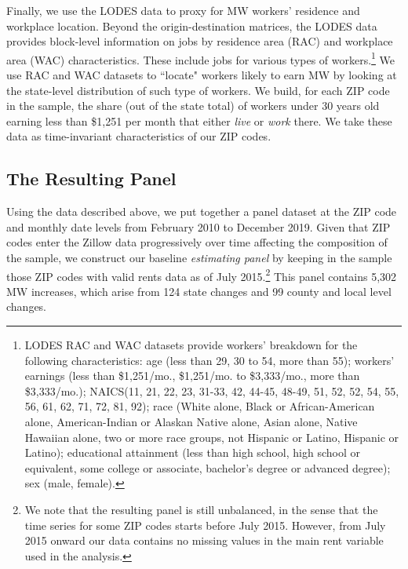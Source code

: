 Finally, we use the LODES data to proxy for MW workers' residence and workplace location. 
Beyond the origin-destination matrices, the LODES data provides block-level information on 
jobs by residence area (RAC) and workplace area (WAC) characteristics. These include jobs 
for various types of workers.\footnote{LODES RAC and WAC datasets provide workers' breakdown 
	for the following characteristics: age (less than 29, 30 to 54, more than 55); workers' 
	earnings (less than \$1,251/mo., \$1,251/mo. to \$3,333/mo., more than \$3,333/mo.); 
	NAICS(11, 21, 22, 23, 31-33, 42, 44-45, 48-49, 51, 52, 52, 54, 55, 56, 61, 62, 71, 72, 
	81, 92); race (White alone, Black or African-American alone, American-Indian or Alaskan 	
	Native alone, Asian alone, Native Hawaiian alone, two or more race groups, not Hispanic 
	or Latino, Hispanic or Latino); educational attainment (less than high school, high 
	school or equivalent, some college or associate, bachelor's degree or advanced degree); 
	sex (male, female).} 
We use RAC and WAC datasets to ``locate" workers likely to earn MW by looking at the 
state-level distribution of such type of workers. We build, for each ZIP code in the sample, 
the share (out of the state total) of workers under 30 years old earning less than \$1,251 
per month that either \textit{live} or \textit{work} there. We take these data as 
time-invariant characteristics of our ZIP codes.


\subsection{The Resulting Panel}\label{sec:data_final_panel}

Using the data described above, we put together a panel dataset at the ZIP code and monthly 
date levels from February 2010 to December 2019. Given that ZIP codes enter the Zillow data 
progressively over time affecting the composition of the sample, we construct our baseline 
\textit{estimating panel} by keeping in the sample those ZIP codes with valid rents data as 
of July 2015.\footnote{We note that the resulting panel is still unbalanced, in the sense 
	that the time series for some ZIP codes starts before July 2015. However, from July
	2015 onward our data contains no missing values in the main rent variable used in the 
	analysis.} 
This panel contains 5,302 MW increases, which arise from 124 state changes 
and 99 county and local level changes.

